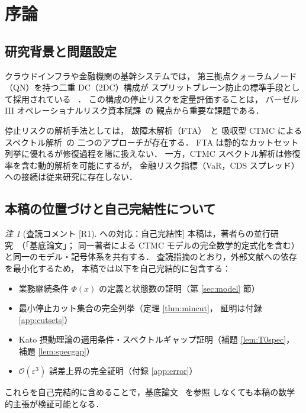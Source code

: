 \documentclass[12pt,a4paper]{article}
\theoremstyle{plain}
\theoremstyle{definition}
\theoremstyle{remark}
\newtheorem{remark}[theorem]{注}
\newcommand{\calO}{\mathcal{O}}
\newcommand{\eps}{\varepsilon}
\begin{document}
\newpage\tableofcontents\newpage

\section{序論}\label{sec:intro}

\subsection{研究背景と問題設定}

クラウドインフラや金融機関の基幹システムでは，
第三拠点クォーラムノード（QN）を持つ二重 DC（2DC）構成が
スプリットブレーン防止の標準手段として採用されている
~\cite{lamport1998,gray1993,ongaro2014}．
この構成の停止リスクを定量評価することは，
バーゼル III オペレーショナルリスク資本賦課~\cite{basel2011}の
観点から重要な課題である．

停止リスクの解析手法としては，
故障木解析（FTA）~\cite{vesely1981,rausand2004}と
吸収型 CTMC によるスペクトル解析~\cite{keilson1979,trivedi2002}の
二つのアプローチが存在する．
FTA は静的なカットセット列挙に優れるが修復過程を陽に扱えない．
一方，CTMC スペクトル解析は修復率を含む動的解析を可能にするが，
金融リスク指標（VaR，CDS スプレッド）への接続は従来研究に存在しない．

\subsection{本稿の位置づけと自己完結性について}

\begin{remark}[査読コメント [R1] への対応：自己完結性]
  本稿は，著者らの並行研究~\cite{habase:v7}（「基底論文」；
  同一著者による CTMC モデルの完全数学的定式化を含む）
  と同一のモデル・記号体系を共有する．
  査読指摘のとおり，外部文献への依存を最小化するため，
  本稿では以下を自己完結的に包含する：
  \begin{itemize}
    \item 業務継続条件 $\Phi(x)$ の定義と状態数の証明（第 \ref{sec:model} 節）
    \item 最小停止カット集合の完全列挙（定理 \ref{thm:mincut}，
          証明は付録 \ref{app:cutsets}）
    \item Kato 摂動理論の適用条件・スペクトルギャップ証明（補題 \ref{lem:T0spec}，
          補題 \ref{lem:specgap}）
    \item $\calO(\eps^3)$ 誤差上界の完全証明（付録 \ref{app:error}）
  \end{itemize}
  これらを自己完結的に含めることで，基底論文~\cite{habase:v7} を参照
  しなくても本稿の数学的主張が検証可能となる．
\end{remark}
\end{document}

